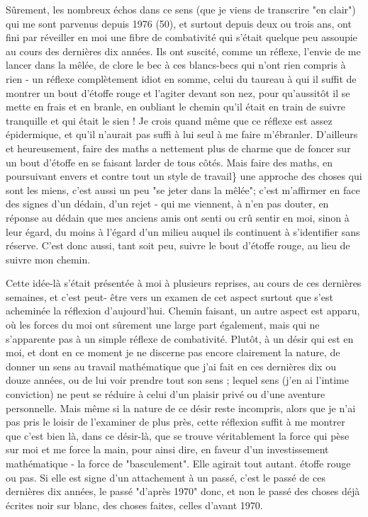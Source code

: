 Sûrement, les nombreux échos dans ce sens (que je viens de transcrire "en clair") qui me sont parvenus depuis 1976 (50), et surtout depuis deux ou trois ans, ont fini par réveiller en moi une fibre de combativité qui s'était quelque peu assoupie au cours des dernières dix années. Ils ont suscité, comme un réflexe, l'envie de me lancer dans la mêlée, de clore le bec à ces blancs-becs qui n'ont rien compris à rien - un réflexe complètement idiot en somme, celui du taureau à qui il suffit de montrer un bout d'étoffe rouge et l'agiter devant son nez, pour qu'aussitôt il se mette en frais et en branle, en oubliant le chemin qu'il était en train de suivre tranquille et qui était le sien ! Je crois quand même que ce réflexe est assez épidermique, et qu’il n’aurait pas suffi à lui seul à me faire m'ébranler. D'ailleurs et heureusement, faire des maths a nettement plus de charme que de foncer sur un bout d'étoffe en se faisant larder de tous côtés. Mais faire des maths, en poursuivant envers et contre tout un style de travail\} une approche des choses qui sont les miens, c'est aussi un peu "se jeter dans la mêlée"; c'est m'affirmer en face des signes d'un dédain, d'un rejet - qui me viennent, à n'en pas douter, en réponse au dédain que mes anciens amis ont senti ou crû sentir en moi, sinon à leur égard, du moins à l'égard d'un milieu auquel ils continuent à s'identifier sans réserve. C'est donc aussi, tant soit peu, suivre le bout d'étoffe rouge, au lieu de suivre mon chemin.

Cette idée-là s'était présentée à moi à plusieurs reprises, au cours de ces dernières semaines, et c'est peut- être vers un examen de cet aspect surtout que s'est acheminée la réflexion d'aujourd'hui. Chemin faisant, un autre aspect est apparu, où les forces du moi ont sûrement une large part également, mais qui ne s'apparente pas à un simple réflexe de combativité. Plutôt, à un désir qui est en moi, et dont en ce moment je ne discerne pas encore clairement la nature, de donner un sens au travail mathématique que j’ai fait en ces dernières dix ou douze années, ou de lui voir prendre tout son sens ; lequel sens (j'en ai l'intime conviction) ne peut se réduire à celui d'un plaisir privé ou d'une aventure personnelle. Mais même si la nature de ce désir reste incompris, alors que je n'ai pas pris le loisir de l'examiner de plus près, cette réflexion suffit à me montrer que c'est bien là, dans ce désir-là, que se trouve véritablement la force qui pèse sur moi et me force la main, pour ainsi dire, en faveur d'un investissement mathématique - la force de "basculement". Elle agirait tout autant. étoffe rouge ou pas. Si elle est signe d'un attachement à un passé, c'est le passé de ces dernières dix années, le passé "d'après 1970" donc, et non le passé des choses déjà écrites noir sur blanc, des choses faites, celles d'avant 1970.

